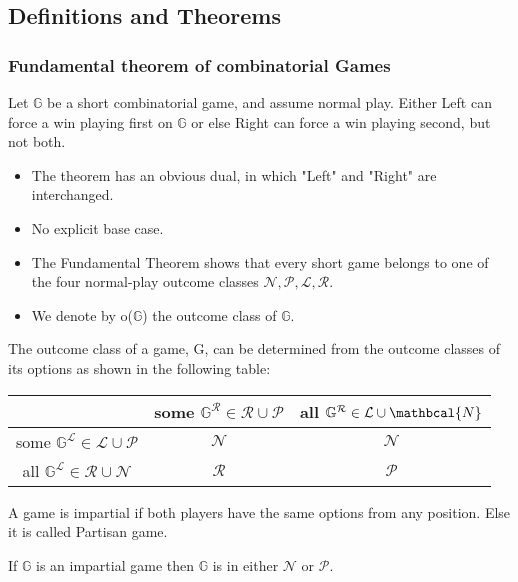 \documentclass[12pt]{beamer}
\begin{document}
\subsection{Definitions and Theorems}

\begin{frame}

\frametitle{Fundamental theorem of combinatorial Games}

\begin{definition}
Let $\mathbb{G}$ be a short combinatorial game, and assume normal play. Either Left can force a win playing first on $\mathbb{G}$ or else Right can force a win playing second, but not both.
\end{definition}

\pause

\begin{itemize}
\item The theorem has an obvious dual, in which "Left"
and "Right" are interchanged.
\pause
\item No explicit base case.
\pause
\item The Fundamental Theorem shows that every short game belongs to one of the four normal-play outcome classes $\mathcal{ N, P, L, R}$.
\pause
\item We denote by o($\mathbb{G}$) the outcome class of $\mathbb{G}$.
\end{itemize}

\end{frame}

\begin{frame}
The outcome class of a game, G, can be determined from the
outcome classes of its options as shown in the following table:
\pause
\begin{center}
\begin{tabular}{ |c|c|c| } 
\hline
 & some $\mathbb{G^\mathcal{R}} \in \mathcal{R} \cup \mathcal{P}$ & all $\mathbb{G^\mathcal{R}} \in \mathcal{L} \cup \mathbcal{N}$ \\ 
\hline
some $\mathbb{G^\mathcal{L}} \in \mathcal{L} \cup \mathcal{P}$ & $\mathcal{N}$ & $\mathcal{N}$ \\
\hline 
all $\mathbb{G^\mathcal{L}} \in \mathcal{R} \cup \mathcal{N}$ & $\mathcal{R}$ & $\mathcal{P}$ \\ 
\hline
\end{tabular}
\end{center}
\pause
\begin{definition}
A game is impartial if both players have the same options from any position. Else it is called Partisan game.
\end{definition}
\pause
\begin{theorem}
If $\mathbb{G}$ is an impartial game then $\mathbb{G}$ is in either $\mathcal{N}$ or $\mathcal{P}$.
\end{theorem}

\end{frame}
\end{document}
